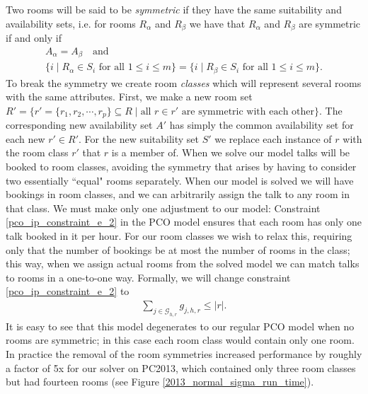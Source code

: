 \documentclass{svjour3}                     %
\begin{document}
Two rooms will be said to be \emph{symmetric} if they have the same suitability and availability sets, i.e. for rooms $R_\alpha$ and $R_\beta$ we have that $R_\alpha$ and $R_\beta$ are symmetric if and only if
\begin{gather*}
	A_\alpha = A_\beta \quad \text{and} \\
	\{i \; | \; R_\alpha \in S_i \text{ for all } 1 \le i \le m\} = \{i \; | \; R_\beta \in S_i \text{ for all } 1 \le i \le m\}.
\end{gather*}
To break the symmetry we create room \emph{classes} which will represent several rooms with the same attributes. 
First, we make a new room set $R' = \{ r'=\{r_1, r_2, \cdots, r_p \}\subseteq R \; | \; \text{all } r \in r' \text{ are symmetric with each other} \}$. 
The corresponding new availability set $A'$ has simply the common availability set for each new $r' \in R'$. 
For the new suitability set $S'$ we replace each instance of $r$ with the room class $r'$ that $r$ is a member of. 
When we solve our model talks will be booked to room classes, avoiding the symmetry that arises by having to consider two essentially ``equal" rooms separately. 
When our model is solved we will have bookings in room classes, and we can arbitrarily assign the talk to any room in that class. 
We must make only one adjustment to our model: Constraint \eqref{pco_ip_constraint_e_2} in the PCO model ensures that each room has only one talk booked in it per hour. 
For our room classes we wish to relax this, requiring only that the number of bookings be at most the number of rooms in the class; this way, when we assign actual rooms from the solved model we can match talks to rooms in a one-to-one way. 
Formally, we will change constraint \eqref{pco_ip_constraint_e_2} to
\begin{gather}
	\sum_{j \in \mathcal G_{h,r}} g_{j,h,r} \le |r|.
\end{gather}
It is easy to see that this model degenerates to our regular PCO model when no rooms are symmetric; in this case each room class would contain only one room. 
In practice the removal of the room symmetries increased performance by roughly a factor of 5x for our solver on PC2013, which contained only three room classes but had fourteen rooms (see Figure \ref{2013_normal_sigma_run_time}). 
\end{document}

